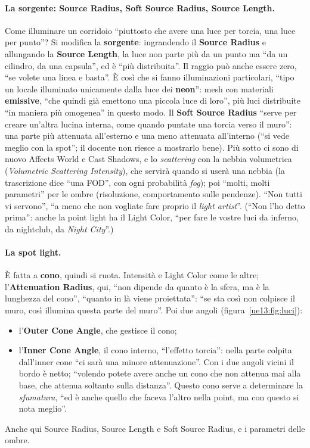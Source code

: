 \paragraph{La sorgente: Source Radius, Soft Source Radius, Source Length.} Come illuminare
un corridoio ``piuttosto che avere una luce per torcia, una luce per punto''? Si modifica la
\textbf{sorgente}: ingrandendo il \textbf{Source Radius} e allungando la \textbf{Source
Length}, la luce non parte più da un punto ma ``da un cilindro, da una capsula'', ed è
``più distribuita''. Il raggio può anche essere zero, ``se volete una linea e basta''. È
così che si fanno illuminazioni particolari, ``tipo un locale illuminato unicamente dalla
luce dei \textbf{neon}'': mesh con materiali \textbf{emissive}, ``che quindi già emettono una
piccola luce di loro'', più luci distribuite ``in maniera più omogenea'' in questo modo. Il
\textbf{Soft Source Radius} ``serve per creare un'altra lucina interna, come quando puntate
una torcia verso il muro'': una parte più attenuata all'esterno e una meno attenuata
all'interno (``si vede meglio con la spot''; il docente non riesce a mostrarlo bene). Più
sotto ci sono di nuovo Affects World e Cast Shadows, e lo \emph{scattering} con la nebbia
volumetrica (\emph{Volumetric Scattering Intensity}), che servirà quando si userà una
nebbia (la trascrizione dice ``una FOD'', con ogni probabilità \emph{fog}); poi ``molti, molti
parametri'' per le ombre (risoluzione, comportamento sulle pendenze). ``Non tutti vi
servono'', ``a meno che non vogliate fare proprio il \emph{light artist}''. (``Non l'ho
detto prima'': anche la point light ha il Light Color, ``per fare le vostre luci da inferno,
da nightclub, da \emph{Night City}''.)

\paragraph{La spot light.} È fatta a \textbf{cono}, quindi si ruota. Intensità e Light
Color come le altre; l'\textbf{Attenuation Radius}, qui, ``non dipende da quanto è la
sfera, ma è la lunghezza del cono'', ``quanto in là viene proiettata'': ``se sta così non
colpisce il muro, così illumina questa parte del muro''. Poi due angoli
(figura~\ref{ue13:fig:luci}):
\begin{itemize}
  \item l'\textbf{Outer Cone Angle}, che gestisce il cono;
  \item l'\textbf{Inner Cone Angle}, il cono interno, ``l'effetto torcia'': nella parte
        colpita dall'inner cone ``ci sarà una minore attenuazione''. Con i due angoli vicini
        il bordo è netto; ``volendo potete avere anche un cono che non attenua mai alla
        base, che attenua soltanto sulla distanza''. Questo cono serve a determinare la
        \emph{sfumatura}, ``ed è anche quello che faceva l'altro nella point, ma con questo
        si nota meglio''.
\end{itemize}
Anche qui Source Radius, Source Length e Soft Source Radius, e i parametri delle ombre.

